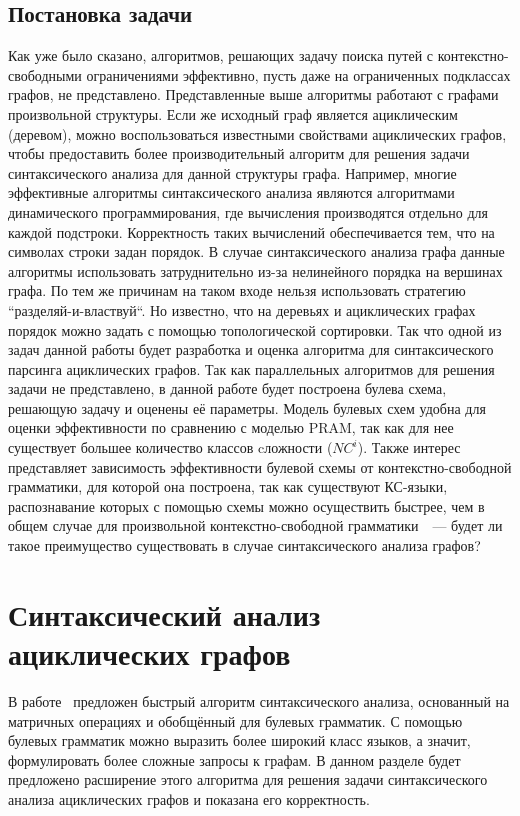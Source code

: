 \subsection{Постановка задачи}
Как уже было сказано, алгоритмов, решающих задачу поиска путей с контекстно-свободными ограничениями эффективно, пусть даже на ограниченных подклассах графов, не представлено.
Представленные выше алгоритмы работают с графами произвольной
структуры. Если же исходный граф является ациклическим
(деревом), можно воспользоваться известными свойствами
ациклических графов, чтобы предоставить более
производительный алгоритм для решения задачи синтаксического
анализа для данной структуры графа. Например, многие эффективные алгоритмы синтаксического анализа \cite{Earley, Kasami, OkhotinParse, Valiant, Yonger} являются алгоритмами динамического программирования, где вычисления производятся отдельно для каждой подстроки. Корректность таких вычислений обеспечивается тем, что на символах строки задан порядок. В случае синтаксического анализа графа данные алгоритмы использовать затруднительно из-за нелинейного порядка на вершинах графа. По тем же причинам на таком входе нельзя использовать стратегию ``разделяй-и-властвуй``. Но известно, что на деревьях и ациклических графах порядок можно задать с помощью топологической сортировки. Так что одной из задач данной работы будет разработка и оценка алгоритма для синтаксического парсинга ациклических графов.
Так как параллельных алгоритмов для решения задачи не представлено, в данной работе будет построена булева схема, решающую задачу и оценены её параметры. Модель булевых схем удобна для оценки эффективности по сравнению с моделью PRAM, так как для нее существует большее количество классов cложности (${NC}^i$). Также интерес представляет зависимость эффективности булевой схемы от контекстно-свободной грамматики, для которой она построена, так как существуют КС-языки, распознавание которых с помощью схемы можно осуществить быстрее, чем в общем случае для произвольной контекстно-свободной грамматики~\cite{Dymond, Ibarra, LLComp}~--- будет ли такое преимущество существовать в случае синтаксического анализа графов?
\section{Синтаксический анализ ациклических графов}
В работе~\cite{OkhotinParse} предложен быстрый алгоритм синтаксического
анализа, основанный на матричных операциях и обобщённый для
булевых грамматик. С помощью булевых грамматик можно выразить
более широкий класс языков, а значит, формулировать более
сложные запросы к графам. В данном разделе будет предложено
расширение этого алгоритма для решения задачи синтаксического
анализа ациклических графов и показана его корректность.
